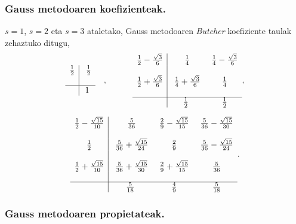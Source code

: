 \subsubsection*{Gauss metodoaren koefizienteak.}

$s=1$, $s=2$ eta $s=3$ ataletako, Gauss metodoaren \cite{Hairer2006} \emph{Butcher} koefiziente taulak \cite{Hairer2006} zehaztuko ditugu,
\begin{equation*}
\begin{array}{c|c}
  \frac{1}{2} & \ \frac{1}{2} \\
  \\
  \hline
   & 1 \\
\end{array} \ \ \ ,  \ \ \ \ \ \ \ \ \
\begin{array}{c|c c}
  \frac{1}{2}-\frac{\sqrt{3}}{6} & \ \frac{1}{4} & \ \frac{1}{4}-\frac{\sqrt{3}}{6} \\
  \\
  \frac{1}{2}+\frac{\sqrt{3}}{6} & \ \frac{1}{4}+\frac{\sqrt{3}}{6} & \ \frac{1}{4} \\
  \\
  \hline
         &  \frac{1}{2} & \ \frac{1}{2} \\
\end{array},
\end{equation*}

\begin{equation*}
\begin{array}{c|c c c}
  \frac{1}{2}-\frac{\sqrt{15}}{10} & \ \frac{5}{36} & \ \frac{2}{9}-\frac{\sqrt{15}}{15} & \ \frac{5}{36}-\frac{\sqrt{15}}{30} \\
  \\
  \frac{1}{2}   & \ \frac{5}{36}+\frac{\sqrt{15}}{24} & \ \frac{2}{9} & \ \frac{5}{36}-\frac{\sqrt{15}}{24} \\
  \\
  \frac{1}{2}+\frac{\sqrt{15}}{10}   & \ \frac{5}{36}+\frac{\sqrt{15}}{30} & \ \frac{2}{9}+\frac{\sqrt{15}}{15} & \ \frac{5}{36} \\
  \\
  \hline
  & \frac{5}{18} & \ \frac{4}{9} & \ \frac{5}{18}
\end{array}.
\end{equation*}

\subsubsection*{Gauss metodoaren propietateak.}


